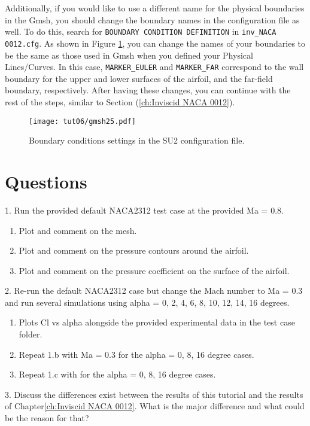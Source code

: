 Additionally, if you would like to use a different name for the physical boundaries in the Gmsh, you should change the boundary names in the configuration file as well. To do this, search for \texttt{BOUNDARY CONDITION DEFINITION} in \texttt{inv\_NACA 0012.cfg}. As shown in Figure \ref{fig6:gmsh25}, you can change the names of your boundaries to be the same as those used in Gmsh when you defined your Physical Lines/Curves. In this case, \texttt{MARKER\_EULER} and \texttt{MARKER\_FAR} correspond to the wall boundary for the upper and lower surfaces of the airfoil, and the far-field boundary, respectively. After having these changes, you can continue with the rest of the steps, similar to Section (\ref{ch:Inviscid NACA 0012}).
\begin{figure}[ht]
    \centering
    \texttt{[image: tut06/gmsh25.pdf]}
    \caption{Boundary conditions settings in the SU2 configuration file.}
    \label{fig6:gmsh25}
\end{figure}
\section{Questions}
1. Run the provided default NACA2312 test case at the provided Ma = 0.8.
\begin{enumerate}[label=(\alph*)]
    \item Plot and comment on the mesh.
    \item Plot and comment on the pressure contours around the airfoil.
    \item Plot and comment on the pressure coefficient on the surface of the airfoil.
\end{enumerate}
2. Re-run the default NACA2312 case but change the Mach number to Ma = 0.3 and run several simulations using alpha = 0, 2, 4, 6, 8, 10, 12, 14, 16 degrees.
\begin{enumerate}[label=(\alph*)]
    \item Plots Cl vs alpha alongside the provided experimental data\cite{ladson1988effects} in the test case folder.
    \item Repeat 1.b with Ma = 0.3 for the alpha = 0, 8, 16 degree cases.
    \item Repeat 1.c with for the alpha = 0, 8, 16 degree cases.
\end{enumerate}
3. Discuss the differences exist between the results of this tutorial and the results of Chapter\ref{ch:Inviscid NACA 0012}. What is the major difference and what could be the reason for that?
